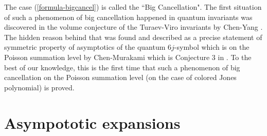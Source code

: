 \documentclass[12pt]{amsart}
\begin{document}
\begin{remark}
The case (\ref{formula-bigcancel}) is called the ``Big Cancellation". The first situation of such a phenomenon of big cancellation happened in quantum invariants was discovered in the volume conjecture of the Turaev-Viro invariants by Chen-Yang \cite{CY18}. 
The hidden reason behind that was found and described as a precise statement of symmetric property of asymptotics of the quantum $6j$-symbol which is on the Poisson summation level by Chen-Murakami which is Conjecture 3 in \cite{CJ17}.
To the best of our knowledge, this is the first time that such a phenomenon of big cancellation on the Poisson summation level (on the case of colored Jones polynomial) is proved.
\end{remark}
 





\section{Asympototic expansions} \label{Section-Asympoticexpansion}

\end{document}
